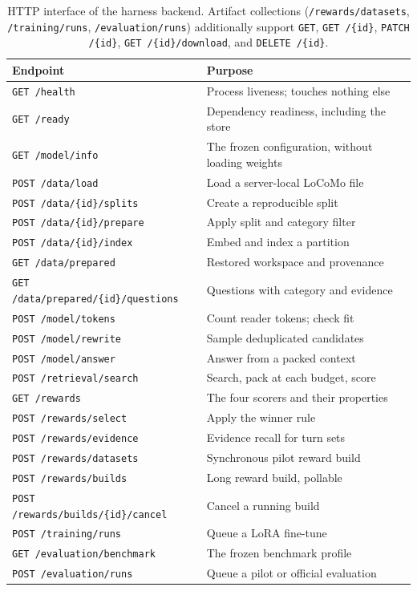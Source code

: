 \documentclass[12pt,letterpaper,oneside]{report}
\newcommand{\code}[1]{\texttt{\small #1}}
\newenvironment{tab}{\begingroup\singlespacing\small}{\endgroup}
\begin{document}
\begin{table}[htbp]
\caption[HTTP interface of the harness backend]{HTTP interface of the harness backend. Artifact collections
(\code{/rewards/datasets}, \code{/training/runs}, \code{/evaluation/runs})
additionally support \code{GET}, \code{GET /\{id\}}, \code{PATCH /\{id\}},
\code{GET /\{id\}/download}, and \code{DELETE /\{id\}}.}
\label{tab:api}
\centering
\begin{tab}
\begin{tabular}{@{}L{2.45in}L{2.4in}@{}}
\toprule
\textbf{Endpoint} & \textbf{Purpose} \\
\midrule
\code{GET /health} & Process liveness; touches nothing else \\
\code{GET /ready} & Dependency readiness, including the store \\
\code{GET /model/info} & The frozen configuration, without loading
weights \\
\code{POST /data/load} & Load a server-local LoCoMo file \\
\code{POST /data/\{id\}/splits} & Create a reproducible split \\
\code{POST /data/\{id\}/prepare} & Apply split and category filter \\
\code{POST /data/\{id\}/index} & Embed and index a partition \\
\code{GET /data/prepared} & Restored workspace and provenance \\
\code{GET /data/prepared/\{id\}/questions} & Questions with category
and evidence \\
\code{POST /model/tokens} & Count reader tokens; check fit \\
\code{POST /model/rewrite} & Sample deduplicated candidates \\
\code{POST /model/answer} & Answer from a packed context \\
\code{POST /retrieval/search} & Search, pack at each budget, score \\
\code{GET /rewards} & The four scorers and their properties \\
\code{POST /rewards/select} & Apply the winner rule \\
\code{POST /rewards/evidence} & Evidence recall for turn sets \\
\code{POST /rewards/datasets} & Synchronous pilot reward build \\
\code{POST /rewards/builds} & Long reward build, pollable \\
\code{POST /rewards/builds/\{id\}/cancel} & Cancel a running build \\
\code{POST /training/runs} & Queue a LoRA fine-tune \\
\code{GET /evaluation/benchmark} & The frozen benchmark profile \\
\code{POST /evaluation/runs} & Queue a pilot or official evaluation \\
\bottomrule
\end{tabular}
\end{tab}
\end{table}
\end{document}
